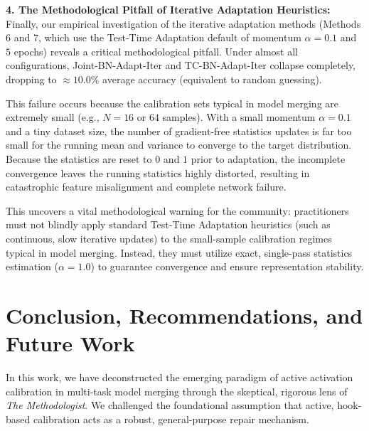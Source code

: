 \documentclass{article}
\begin{document}
\textbf{4. The Methodological Pitfall of Iterative Adaptation Heuristics:}
Finally, our empirical investigation of the iterative adaptation methods (Methods 6 and 7, which use the Test-Time Adaptation default of momentum $\alpha = 0.1$ and $5$ epochs) reveals a critical methodological pitfall. Under almost all configurations, Joint-BN-Adapt-Iter and TC-BN-Adapt-Iter collapse completely, dropping to $\approx 10.0\%$ average accuracy (equivalent to random guessing).

This failure occurs because the calibration sets typical in model merging are extremely small (e.g., $N=16$ or $64$ samples). With a small momentum $\alpha = 0.1$ and a tiny dataset size, the number of gradient-free statistics updates is far too small for the running mean and variance to converge to the target distribution. Because the statistics are reset to $0$ and $1$ prior to adaptation, the incomplete convergence leaves the running statistics highly distorted, resulting in catastrophic feature misalignment and complete network failure. 

This uncovers a vital methodological warning for the community: practitioners must not blindly apply standard Test-Time Adaptation heuristics (such as continuous, slow iterative updates) to the small-sample calibration regimes typical in model merging. Instead, they must utilize exact, single-pass statistics estimation ($\alpha = 1.0$) to guarantee convergence and ensure representation stability.

\section{Conclusion, Recommendations, and Future Work}
\label{sec:conclusion}
In this work, we have deconstructed the emerging paradigm of active activation calibration in multi-task model merging through the skeptical, rigorous lens of \textit{The Methodologist}. We challenged the foundational assumption that active, hook-based calibration acts as a robust, general-purpose repair mechanism. 
\end{document}

